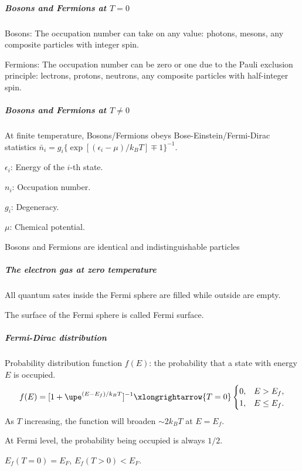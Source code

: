 \subparagraph{Bosons and Fermions at $T = 0$}

\begin{enumext}
  \item Bosons: The occupation number can take on any value:
  photons, mesons, any composite particles with integer spin.
  \item Fermions: The occupation number can be zero or one due to the Pauli
  exclusion principle: lectrons, protons, neutrons, any composite
  particles with half-integer spin.
\end{enumext}

\subparagraph{Bosons and Fermions at $T \neq 0$}\leavevmode

At finite temperature, Bosons/Fermions obeys Bose-Einstein/Fermi-Dirac
statistics $\bar n_i = g_i\{\exp[(\epsilon_i-\mu)/k_BT] \mp 1\}^{-1}$.
\begin{enumext}[columns = 2]
  \item $\epsilon_i$: Energy of the $i$-th state.
  \item $n_i$: Occupation number.
  \item $g_i$: Degeneracy.
  \item $\mu$: Chemical potential.
\end{enumext}
Bosons and Fermions are identical and indistinguishable particles

\subparagraph{The electron gas at zero temperature}

\begin{enumext}
  \item  All quantum sates inside the Fermi sphere are filled while outside
  are empty.
  \item The surface of the Fermi sphere is called Fermi surface.
\end{enumext}

\subparagraph{Fermi-Dirac distribution}\leavevmode

Probability distribution function $f(E)$: the probability that a state
with energy $E$ is occupied.
\[
  f(E) = [1 + \upe^{(E-E_f)/k_BT}]^{-1} \xlongrightarrow{T=0}
  \begin{cases}
    0, & E > E_f,\\
    1, & E \leq E_f.
  \end{cases}
\]
As $T$ increasing, the function will broaden $\sim 2k_BT$ at $E = E_f$.
\begin{enumext}
  \item At Fermi level, the probability being occupied is always $1/2$.
  \item $E_f(T = 0) = E_F$, $E_f(T > 0) < E_F$.
\end{enumext}

